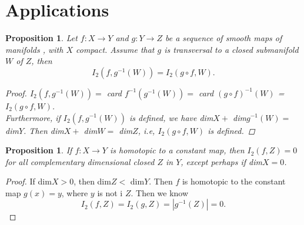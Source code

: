 \documentclass[psamsfonts]{amsart}
\newtheorem{prop}[theorem]{Proposition}
\theoremstyle{definition}
\theoremstyle{remark}
\numberwithin{equation}{section}
\begin{document}
	\section{Applications}
		\begin{prop}
			Let $f: X \to Y$ and $g: Y \to Z$ be a sequence of smooth maps of manifolds , with $X$ compact. Assume that $g$ is transversal to a closed submanifold $W$ of $Z$, then
			\begin{equation}
				I_2(f,g^{-1}(W)) = I_2(g\circ f, W).
			\end{equation}
			\begin{proof}
				$I_2(f,g^{-1}(W)) =$ card $f^{-1}(g^{-1}(W))=$ card $(g \circ f)^{-1}(W)$ = $I_2(g\circ f, W)$.\\
				Furthermore, if $I_2(f,g^{-1}(W))$ is defined, we have dim$X+$ dim$g^{-1}(W)=$ dim$Y$. Then dim$X+$ dim$W=$ dim$Z$, i.e, $I_2(g\circ f, W)$ is defined.
			\end{proof}
		\end{prop}
		\begin{prop}
			If $f: X \to Y$ is homotopic to a constant map, then $I_2(f,Z)=0$ for all complementary dimensional closed $Z$ in $Y$, except perhaps if dim$X=0$.
		\end{prop}
		\begin{proof}
			If dim$X >0$, then dim$Z <$ dim$Y$. Then $f$ is homotopic to the constant map $g(x) = y$, where $y$ is not i $Z$. Then we know 
			\begin{equation}
				I_2(f,Z) = I_2(g,Z) = |g^{-1}(Z)| = 0.
			\end{equation}
		\end{proof}
\end{document}
